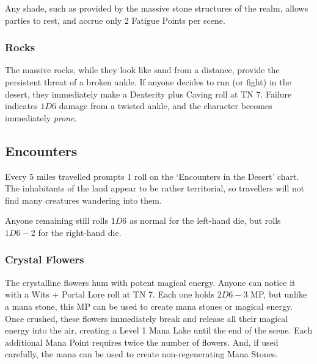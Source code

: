 \begin{multicols}{2}
Any shade, such as provided by the massive stone structures of the realm, allows parties to rest, and accrue only 2 Fatigue Points per scene.

\subsubsection{Rocks}

The massive rocks, while they look like sand from a distance, provide the persistent threat of a broken ankle.
If anyone decides to run (or fight) in the desert, they immediately make a Dexterity plus Caving roll at TN 7.
Failure indicates $1D6$ damage from a twisted ankle, and the character becomes immediately \emph{prone}.

\subsection{Encounters}

Every 5 miles travelled prompts 1 roll on the `Encounters in the Desert' chart.
The inhabitants of the land appear to be rather territorial, so travellers will not find many creatures wandering into them.

Anyone remaining still rolls $1D6$ as normal for the left-hand die,
but rolls $1D6-2$ for the right-hand die.


\subsubsection{Crystal Flowers}
\label{crystalFlowers}

The crystalline flowers hum with potent magical energy.
Anyone can notice it with a Wits + Portal Lore roll at TN 7.
Each one holds $2D6-3$ MP, but unlike a mana stone, this MP can be used to create mana stones or magical energy.
Once crushed, these flowers immediately break and release all their magical energy into the air, creating a Level 1 Mana Lake until the end of the scene.
Each additional Mana Point requires twice the number of flowers.
And, if used carefully, the mana can be used to create non-regenerating Mana Stones.



\end{multicols}

